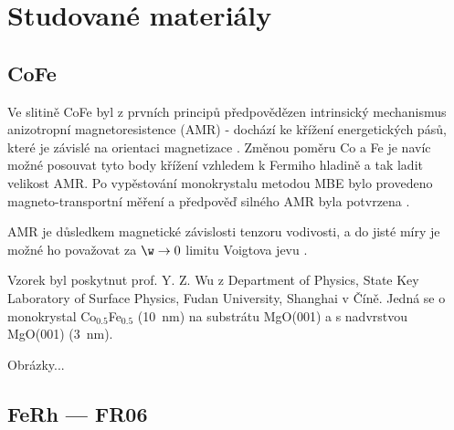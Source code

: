 \chapter{Studované materiály}

\section{CoFe \cite{AMRCoFe}}

Ve slitině CoFe byl z prvních principů předpovědězen intrinsický mechanismus anizotropní magnetoresistence (AMR) - dochází ke křížení energetických pásů, které je závislé na orientaci magnetizace \cite{AMRCoFe}.
Změnou poměru Co a Fe je navíc možné posouvat tyto body křížení vzhledem k Fermiho hladině a tak ladit velikost AMR.
Po vypěstování monokrystalu metodou MBE bylo provedeno magneto-transportní měření a předpověď silného AMR byla potvrzena \cite{AMRCoFe}.

AMR je důsledkem magnetické závislosti tenzoru vodivosti, a do jisté míry je možné ho považovat za $\w\to 0$ limitu Voigtova jevu \cite{Ostatnicky}.

Vzorek byl poskytnut prof. Y. Z. Wu z Department of Physics, State Key Laboratory of Surface Physics, Fudan University, Shanghai v Číně.
Jedná se o monokrystal Co$_{\num{0.5}}$Fe$_{\num{0.5}}$ (\SI{10}{\nano\meter}) na substrátu MgO(001) a s nadvrstvou MgO(001) (\SI{3}{\nano\meter}).

Obrázky...

\section{FeRh --- FR06}



